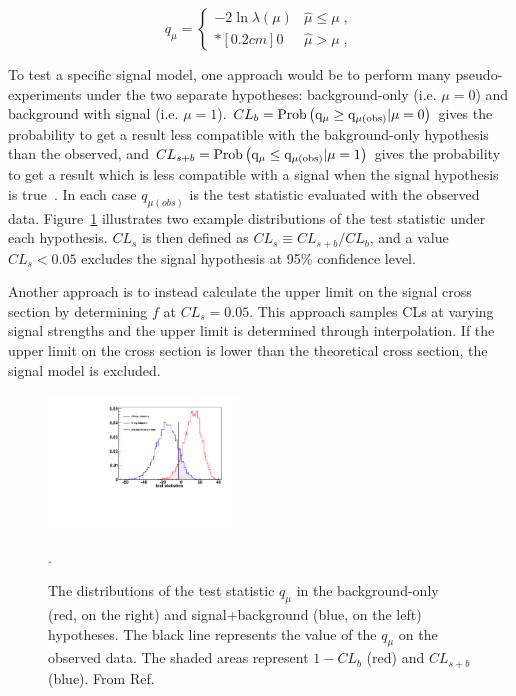 \begin{equation}
\label{eq:qmu}
q_{\mu} =
\left\{ \! \! \begin{array}{ll}
               - 2 \ln \lambda(\mu)  & \hat{\mu} \le \mu  \;, \\*[0.2 cm]
               0 & \hat{\mu} > \mu \;,
              \end{array}
       \right.
\end{equation}

To test a specific signal model, one approach would be to perform many 
pseudo-experiments under the two separate hypotheses: background-only 
(i.e. $\mu=0$) and background with signal (i.e. $\mu=1$). 
$CL_{b} = \rm{Prob}\left(q_{\mu} \geq q_{\mu(obs)}| \mu=0 \right)$ 
gives the probability to get a result less compatible with the 
bakground-only hypothesis than the observed, and $CL_{s+b} = \rm{Prob}\left(q_{\mu} \leq q_{\mu(obs)}| \mu=1 \right)$ 
gives the probability to get a result which is less compatible with a signal when the 
signal hypothesis is true~\cite{read,Junk}. In each case $q_{\mu(obs)}$ is the test statistic evaluated 
with the observed data. Figure~\ref{fig:hybrid_plot} illustrates two example distributions of
the test statistic under each hypothesis.  $CL_{s}$ is then defined as $CL_{s} \equiv CL_{s+b}/CL_{b}$, 
and a value $CL_{s} < 0.05$ excludes the signal hypothesis at 95\% confidence level. 

Another approach is to instead calculate the upper limit on the signal 
cross section by determining $f$ at $CL_{s} = 0.05$.  This approach samples 
CLs at varying signal strengths and the upper limit is 
determined through interpolation. If the upper limit on the cross section 
is lower than the theoretical cross section, the signal model is excluded.

\begin{figure}[h!t]
  \begin{center}
      \includegraphics[width=0.45\textwidth,]{figures/hybrid_plot}
      \caption{\label{fig:hybrid_plot} The distributions of the test statistic $q_{\mu}$
        in the background-only (red, on the right) and signal+background (blue, on the left) hypotheses. 
        The black line represents the value of the $q_{\mu}$ on the observed data. The shaded areas represent 
        $1-CL_{b}$ (red) and $CL_{s+b}$ (blue). From Ref.~\cite{Moneta:1289965}}.
    \label{fig:hybrid_plot}
  \end{center}
\end{figure}

